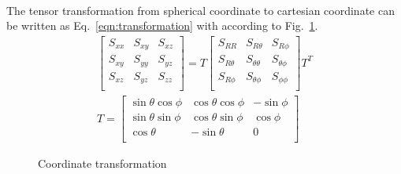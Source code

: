 \paragraph{}
The tensor transformation from spherical coordinate to cartesian coordinate can be written as Eq.~\ref{eqn:transformation} with according to Fig.~\ref{octree_fig:oct_ex_hollow_sphere_tran}.
\begin{subequations}
  \begin{align}
    \begin{bmatrix}
      S_{xx} & S_{xy} & S_{xz} \\
      S_{xy} & S_{yy} & S_{yz} \\
      S_{xz} & S_{yz} & S_{zz} \\
    \end{bmatrix} = T\begin{bmatrix}
      S_{RR} & S_{R\theta} & S_{R\phi} \\
      S_{R\theta} & S_{\theta\theta} & S_{\theta\phi}\\
      S_{R\phi} & S_{\theta\phi} & S_{\phi\phi} \\
    \end{bmatrix} T^T\\
  T = 
\begin{bmatrix}
\sin\theta\cos\phi & \cos\theta\cos\phi & -\sin\phi \\
\sin\theta\sin\phi & \cos\theta\sin\phi & \cos\phi  \\
\cos\theta & -\sin\theta & 0 \\
\end{bmatrix}
\end{align}
\label{eqn:transformation}
\end{subequations}

\begin{figure}[h!]
    \centering
    \caption{Coordinate transformation}
    \label{octree_fig:oct_ex_hollow_sphere_tran}
  \end{figure}
  
